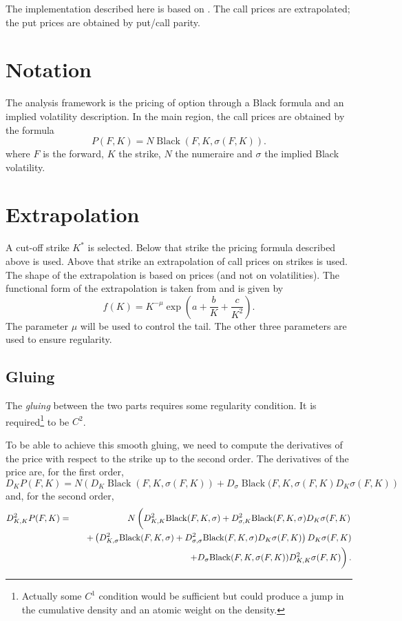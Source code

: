 \documentclass[]{amsart}
\newcommand{\black}{{\operatorname{Black}}}
\begin{document}
The implementation described here is based on \cite{BDK.2008.1}. The call prices are extrapolated; the put prices are obtained by put/call parity.

\section{Notation}

The analysis framework is the pricing of option through a Black formula and an implied volatility description. In the main region, the call prices are obtained by the formula
\begin{equation}
\label{EqnPrice}
P(F,K) = N \black(F, K, \sigma(F,K)).
\end{equation}
where $F$ is the forward, $K$ the strike, $N$ the numeraire and $\sigma$ the implied Black volatility.

\section{Extrapolation}

A cut-off strike $K^*$ is selected. Below that strike the pricing formula described above is used. Above that strike an extrapolation of call prices on strikes is used. The shape of the extrapolation is based on prices (and not on volatilities). The functional form of the extrapolation is taken from \cite{BDK.2008.1} and is given by
\begin{equation}
\label{EqnExtra}
f(K) = K^{-\mu} \exp\left( a + \frac{b}{K} + \frac{c}{K^2} \right).
\end{equation}
The parameter $\mu$ will be used to control the tail. The other three parameters are used to ensure regularity.
\subsection{Gluing}

The \emph{gluing} between the two parts requires some regularity condition. It is required\footnote{Actually some $C^1$ condition would be sufficient but could produce a jump in the cumulative density and an atomic weight on the density.} to be $C^2$. 

To be able to achieve this smooth gluing, we need to compute the derivatives of the price with respect to the strike up to the second order. The derivatives of the price are, for the first order,
\[
D_K P(F,K) = N \left( D_K \black(F, K, \sigma(F,K)) + D_\sigma \black(F, K, \sigma(F,K) D_K \sigma(F,K) \right)
\]
and, for the second order,
\begin{eqnarray*}
D^2_{K,K} P(F,K) & = & N \left(\vphantom{\int} D^2_{K,K} \black(F, K, \sigma) +D^2_{\sigma,K} \black(F, K, \sigma) D_K \sigma(F,K) \right.\\
& & \quad + \left( D^2_{K,\sigma}\black(F, K, \sigma) + D^2_{\sigma,\sigma}\black(F, K, \sigma) D_K \sigma(F,K) \right) D_K \sigma(F,K) \\
& & \quad \left. +  D_\sigma \black(F, K, \sigma(F,K)) D^2_{K,K} \sigma(F,K) \vphantom{\int}\right).
\end{eqnarray*}
\end{document}
